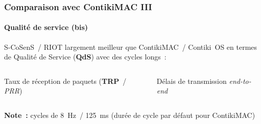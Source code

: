 \documentclass[10pt,c]{beamer}
\newcommand{\lang}[1]{\textit{#1}}
\newcommand{\nom}[1]{\textbf{#1}}
\begin{document}
\begin{frame}[label=comparContikiMAC3]
\frametitle{Comparaison avec ContikiMAC III}
\framesubtitle{Qualité de service (bis)}

\vspace{-0.25cm}

S-CoSenS~/ RIOT largement meilleur que ContikiMAC~/ Contiki~OS en termes
de Qualité de Service (\nom{QdS}) avec des cycles longs~:

\begin{columns}[c]

\begin{column}{5.5cm}


{\footnotesize Taux de réception de paquets
                \scriptsize(\nom{TRP}~/ \lang{PRR})}

\end{column}

\begin{column}{5.5cm}


{\footnotesize Délais de transmission \lang{end-to-end}}
\end{column}

\end{columns}

\vspace{0.5cm}

\scriptsize{\textbf{Note~:} cycles de 8~Hz~/ 125~ms (durée de cycle
 par défaut pour ContikiMAC)}

\end{frame}
\end{document}
